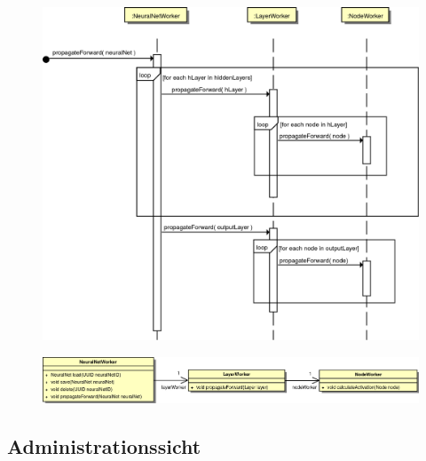 \begin{figure}[H]
\begin{center}
\includegraphics[width=13cm]{Abbildungen/UML/uml_ronny/forwardPropagationSD.png}
\end{center}
\end{figure}

\begin{figure}[H]
\begin{center}
\includegraphics[width=\textwidth]{Abbildungen/UML/uml_ronny/workerKlassenDiagramm.png}
\end{center}
\end{figure}

\subsection{Administrationssicht}


